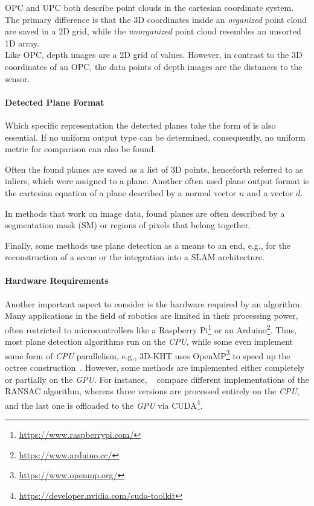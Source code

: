 \documentclass[main.tex]{subfiles}
\begin{document}
OPC and UPC both describe point clouds in the cartesian coordinate system. The primary difference is that the 3D coordinates inside
an \textit{organized} point cloud are saved in a 2D grid, while the \textit{unorganized} point cloud resembles an unsorted 1D array.\\
Like OPC, depth images are a 2D grid of values. However, in contrast to the 3D coordinates of an OPC, the data points of depth images
are the distances to the sensor.



\paragraph{Detected Plane Format} \label{subsec:planeformat}
Which specific representation the detected planes take the form of is also essential.
If no uniform output type can be determined, consequently, no uniform metric for comparison can also be found.


Often the found planes are saved as a list of 3D points, henceforth referred to as inliers, which were assigned to a plane.
Another often used plane output format is the cartesian equation of a plane described by a normal vector $n$ and a vector $d$.

In methods that work on image data, found planes are often described by a segmentation mask (SM) or regions of pixels that belong together.

Finally, some methods use plane detection as a means to an end, e.g., for the reconstruction of a scene or the integration into
a SLAM architecture.

\paragraph{Hardware Requirements}
\label{par:hardware}
Another important aspect to consider is the hardware required by an algorithm.
Many applications in the field of robotics are limited in their processing power, often restricted to microcontrollers like
a Raspberry Pi\footnote{\href{https://www.raspberrypi.com/}{https://www.raspberrypi.com/}} or an Arduino\footnote{\href{https://www.arduino.cc/}{https://www.arduino.cc/}}.
Thus, most plane detection algorithms run on the \textit{CPU}, while some even implement some form of \textit{CPU} parallelism, e.g., 3D-KHT uses OpenMP\footnote{\href{https://www.openmp.org/}{https://www.openmp.org/}}
to speed up the octree construction~\cite[Section~4]{LimbergerOliveira2015HT3D}.
However, some methods are implemented either completely or partially on the \textit{GPU}.
For instance, \citeauthor{Hidalgo-Paniagua_Vega-Rodriguez_Pavón_Ferruz_2015}~\cite{Hidalgo-Paniagua_Vega-Rodriguez_Pavón_Ferruz_2015} compare different
implementations of the RANSAC algorithm, whereas three versions are processed entirely on the \textit{CPU}, and the last one is offloaded
to the \textit{GPU} via CUDA\footnote{\href{https://developer.nvidia.com/cuda-toolkit}{https://developer.nvidia.com/cuda-toolkit}}.
\end{document}

